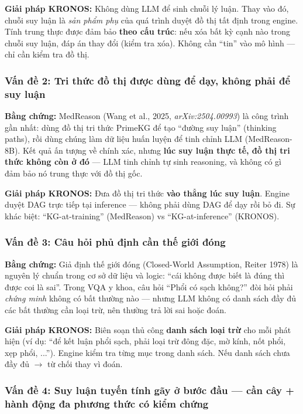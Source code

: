 \documentclass[11pt,a4paper]{article}
\begin{document}
\textbf{Giải pháp KRONOS:} Không dùng LLM để sinh chuỗi lý luận. Thay vào đó, chuỗi suy luận là \emph{sản phẩm phụ} của quá trình duyệt đồ thị tất định trong engine. Tính trung thực được đảm bảo \textbf{theo cấu trúc}: nếu xóa bất kỳ cạnh nào trong chuỗi suy luận, đáp án thay đổi (kiểm tra xóa). Không cần ``tin'' vào mô hình --- chỉ cần kiểm tra đồ thị.

\subsubsection{Vấn đề 2: Tri thức đồ thị được dùng để dạy, không phải để suy luận}

\textbf{Bằng chứng:} MedReason (Wang et al., 2025, \textit{arXiv:2504.00993}) là công trình gần nhất: dùng đồ thị tri thức PrimeKG để tạo ``đường suy luận'' (thinking paths), rồi dùng chúng làm dữ liệu huấn luyện để tinh chỉnh LLM (MedReason-8B). Kết quả ấn tượng về chính xác, nhưng \textbf{lúc suy luận thực tế, đồ thị tri thức không còn ở đó} --- LLM tinh chỉnh tự sinh reasoning, và không có gì đảm bảo nó trung thực với đồ thị gốc.

\textbf{Giải pháp KRONOS:} Đưa đồ thị tri thức \textbf{vào thẳng lúc suy luận}. Engine duyệt DAG trực tiếp tại inference --- không phải dùng DAG để dạy rồi bỏ đi. Sự khác biệt: ``KG-at-training'' (MedReason) vs ``KG-at-inference'' (KRONOS).

\subsubsection{Vấn đề 3: Câu hỏi phủ định cần thế giới đóng}

\textbf{Bằng chứng:} Giả định thế giới đóng (Closed-World Assumption, Reiter 1978) là nguyên lý chuẩn trong cơ sở dữ liệu và logic: ``cái không được biết là đúng thì được coi là sai''. Trong VQA y khoa, câu hỏi ``Phổi có sạch không?'' đòi hỏi phải \emph{chứng minh} không có bất thường nào --- nhưng LLM không có danh sách đầy đủ các bất thường cần loại trừ, nên thường trả lời sai hoặc đoán.

\textbf{Giải pháp KRONOS:} Biên soạn thủ công \textbf{danh sách loại trừ} cho mỗi phát hiện (ví dụ: ``để kết luận phổi sạch, phải loại trừ {đông đặc, mờ kính, nốt phổi, xẹp phổi, ...}''). Engine kiểm tra từng mục trong danh sách. Nếu danh sách chưa đầy đủ $\to$ từ chối thay vì đoán.

\subsubsection{Vấn đề 4: Suy luận tuyến tính gãy ở bước đầu --- cần cây + hành động đa phương thức có kiểm chứng}
\end{document}
